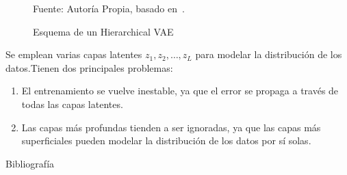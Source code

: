 \documentclass{beamer}
\begin{document}
\begin{frame}
\begin{figure}
        \caption{Esquema de un Hierarchical VAE}
        \label{fig:hierarchical_vae}
        \vspace{-1em}
        {\tiny \color{gray} Fuente: Autoría Propia, basado en~\cite{lai2026principlesdiffusionmodels}.}
    \end{figure}

    Se emplean varias capas latentes $z_1, z_2, \dots, z_L$ para modelar la distribución de los datos.\pause Tienen dos principales problemas:
    \begin{enumerate}
        \item El entrenamiento se vuelve inestable, ya que el error se propaga a través de todas las capas latentes.\pause
        \item Las capas más profundas tienden a ser ignoradas, ya que las capas más superficiales pueden modelar la distribución de los datos por sí solas.
    \end{enumerate}
\end{frame}




\begin{frame}[allowframebreaks]{Bibliografía}
    \nocite{lai2026principlesdiffusionmodels}
    \printbibliography
\end{frame}
\end{document}
